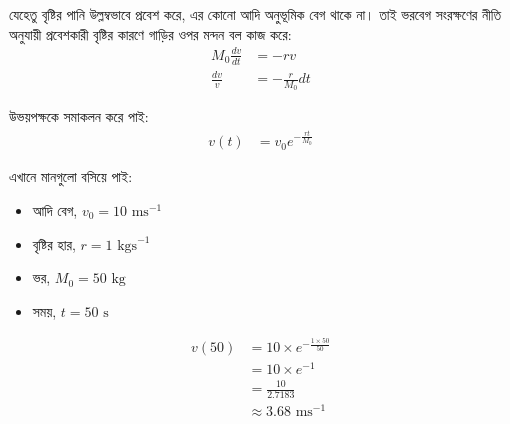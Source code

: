 \documentclass[12pt, a4paper]{article}
\begin{document}
\begin{tcolorbox}[solutionbox={সমাধান (Solution)}]
\noindent
যেহেতু বৃষ্টির পানি উল্লম্বভাবে প্রবেশ করে, এর কোনো আদি অনুভূমিক বেগ থাকে না। তাই ভরবেগ সংরক্ষণের নীতি অনুযায়ী প্রবেশকারী বৃষ্টির কারণে গাড়ির ওপর মন্দন বল কাজ করে:
\begin{align*}
    M_0 \frac{dv}{dt} &= -r v \\
    \frac{dv}{v} &= -\frac{r}{M_0} dt
\end{align*}

উভয়পক্ষকে সমাকলন করে পাই:
\begin{align*}
    v(t) &= v_0 e^{-\frac{r t}{M_0}}
\end{align*}

এখানে মানগুলো বসিয়ে পাই:
\begin{itemize}
    \item আদি বেগ, $v_0 = 10\text{ ms}^{-1}$
    \item বৃষ্টির হার, $r = 1\text{ kgs}^{-1}$
    \item ভর, $M_0 = 50\text{ kg}$
    \item সময়, $t = 50\text{ s}$
\end{itemize}

\begin{align*}
    v(50) &= 10 \times e^{-\frac{1 \times 50}{50}} \\
          &= 10 \times e^{-1} \\
          &= \frac{10}{2.7183} \\
          &\approx \mathbf{3.68}\text{ ms}^{-1}
\end{align*}
\end{tcolorbox}
\end{document}
